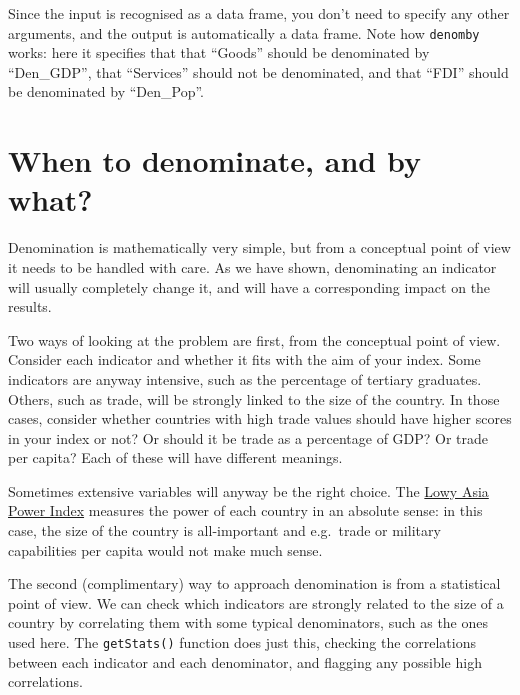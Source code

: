 \documentclass[
]{book}
\begin{document}
Since the input is recognised as a data frame, you don't need to specify any other arguments, and the output is automatically a data frame. Note how \texttt{denomby} works: here it specifies that that ``Goods'' should be denominated by ``Den\_GDP'', that ``Services'' should not be denominated, and that ``FDI'' should be denominated by ``Den\_Pop''.

\hypertarget{when-to-denominate-and-by-what}{%
\section{When to denominate, and by what?}\label{when-to-denominate-and-by-what}}

Denomination is mathematically very simple, but from a conceptual point of view it needs to be handled with care. As we have shown, denominating an indicator will usually completely change it, and will have a corresponding impact on the results.

Two ways of looking at the problem are first, from the conceptual point of view. Consider each indicator and whether it fits with the aim of your index. Some indicators are anyway intensive, such as the percentage of tertiary graduates. Others, such as trade, will be strongly linked to the size of the country. In those cases, consider whether countries with high trade values should have higher scores in your index or not? Or should it be trade as a percentage of GDP? Or trade per capita? Each of these will have different meanings.

Sometimes extensive variables will anyway be the right choice. The \href{https://power.lowyinstitute.org/}{Lowy Asia Power Index} measures the power of each country in an absolute sense: in this case, the size of the country is all-important and e.g.~trade or military capabilities per capita would not make much sense.

The second (complimentary) way to approach denomination is from a statistical point of view. We can check which indicators are strongly related to the size of a country by correlating them with some typical denominators, such as the ones used here. The \texttt{getStats()} function does just this, checking the correlations between each indicator and each denominator, and flagging any possible high correlations.
\end{document}
